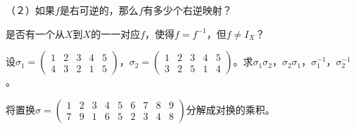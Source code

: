 \documentclass{article}
\begin{document}
\begin{CJK}{UTF8}{gbsn}
\begin{Exercise}
（２）如果$f$是右可逆的，那么$f$有多少个右逆映射？
\end{Exercise}
\vspace{10cm}
\begin{Exercise}
是否有一个从$X$到$X$的一一对应$f$，使得$f=f^{-1}$，但$f\neq I_X$？
\end{Exercise}
\vspace{5cm}
\begin{Exercise}
 设$\sigma_1=\begin{pmatrix}1&2&3&4&5\\4&3&2&1&5\end{pmatrix}$，$\sigma_2=\begin{pmatrix}1&2&3&4&5\\3&2&5&1&4\end{pmatrix}$。求$\sigma_1\sigma_2$，$\sigma_2\sigma_1$，$\sigma_1^{-1}$，$\sigma_2^{-1}$。
\end{Exercise}
\vspace{10cm}
\begin{Exercise}
  将置换$\sigma=\begin{pmatrix}1&2&3&4&5&6&7&8&9\\7&9&1&6&5&2&3&4&8\end{pmatrix}$分解成对换的乘积。
\end{Exercise}



\end{CJK}
\end{document}
